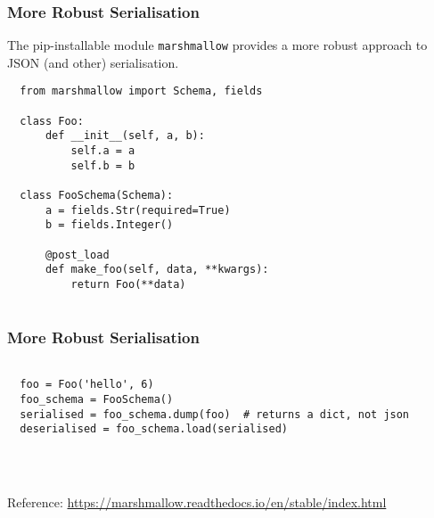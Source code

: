 \documentclass[10pt]{beamer}
\begin{document}
\begin{frame}[fragile]
  \frametitle{More Robust Serialisation}
  
  The pip-installable module \texttt{marshmallow} provides 
  a more robust approach to JSON (and other) serialisation.
  \begin{verbatim}
  from marshmallow import Schema, fields
  
  class Foo:
      def __init__(self, a, b):
          self.a = a
          self.b = b
          
  class FooSchema(Schema):
      a = fields.Str(required=True)
      b = fields.Integer()
      
      @post_load
      def make_foo(self, data, **kwargs):
          return Foo(**data)         
                     
  \end{verbatim} 
   
   
\end{frame}

\begin{frame}[fragile]
  \frametitle{More Robust Serialisation}
  
  \begin{verbatim}
  
  foo = Foo('hello', 6)
  foo_schema = FooSchema()
  serialised = foo_schema.dump(foo)  # returns a dict, not json
  deserialised = foo_schema.load(serialised)
  
          
                     
  \end{verbatim} 
  
   Reference: \url{https://marshmallow.readthedocs.io/en/stable/index.html}
   
   
\end{frame}
\end{document}
